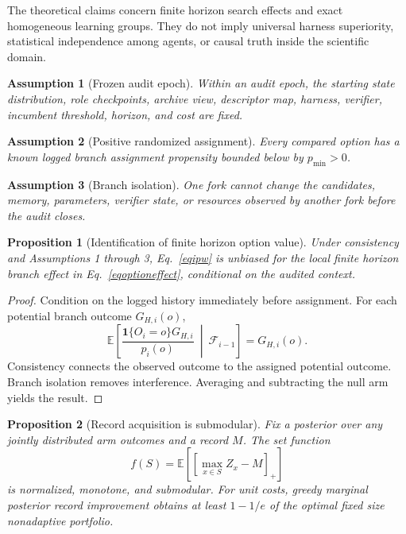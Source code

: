 \documentclass{article}
\newcommand{\pos}[1]{\left[#1\right]_{+}}
\newcommand{\ind}{\mathbf{1}}
\newtheorem{proposition}{Proposition}
\newtheorem{assumption}{Assumption}
\begin{document}
The theoretical claims concern finite horizon search effects and exact homogeneous learning groups. They do not imply universal harness superiority, statistical independence among agents, or causal truth inside the scientific domain.

\begin{assumption}[Frozen audit epoch]
Within an audit epoch, the starting state distribution, role checkpoints, archive view, descriptor map, harness, verifier, incumbent threshold, horizon, and cost are fixed.
\end{assumption}

\begin{assumption}[Positive randomized assignment]
Every compared option has a known logged branch assignment propensity bounded below by $p_{\min}>0$.
\end{assumption}

\begin{assumption}[Branch isolation]
One fork cannot change the candidates, memory, parameters, verifier state, or resources observed by another fork before the audit closes.
\end{assumption}

\begin{proposition}[Identification of finite horizon option value]
Under consistency and Assumptions 1 through 3, Eq.~\eqref{eqipw} is unbiased for the local finite horizon branch effect in Eq.~\eqref{eqoptioneffect}, conditional on the audited context.
\end{proposition}

\begin{proof}
Condition on the logged history immediately before assignment. For each potential branch outcome $G_{H,i}(o)$,
\begin{equation*}
\mathbb E\!\left[
\frac{\ind\{O_i=o\}G_{H,i}}{p_i(o)}
\ \middle|\ 
\mathcal F_{i-1}
\right]
=
G_{H,i}(o).
\end{equation*}
Consistency connects the observed outcome to the assigned potential outcome. Branch isolation removes interference. Averaging and subtracting the null arm yields the result.
\end{proof}

\begin{proposition}[Record acquisition is submodular]
Fix a posterior over any jointly distributed arm outcomes and a record $M$. The set function
\begin{equation*}
f(S)
=
\mathbb E\!\left[
\pos{\max_{x\in S}Z_x-M}
\right]
\end{equation*}
is normalized, monotone, and submodular. For unit costs, greedy marginal posterior record improvement obtains at least $1-1/e$ of the optimal fixed size nonadaptive portfolio.
\end{proposition}
\end{document}
